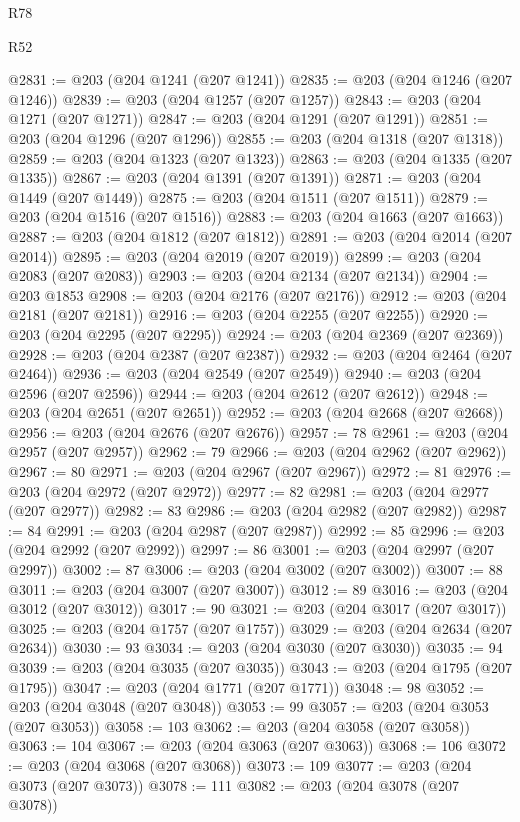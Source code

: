 \begin{lexlean}{R78}
\begin{lexlean}{R52}
\begin{coremodule}
{{{{{{{{{{{{{{{{{{{{{{{{{{{{{{{{{{{{{{{{{{{{{{{{{{{{{{{{{{{{{{{{{{{{{{{{{{{{{{{{{{{{{{{{{{{{{{{{{{{{{{{{{{{{{{{{{{{{{{{{{{{{{{{{{{{{{{{{{{{{{{{{{{{{{{{{{{{{{{{{{{{{{{{{{{{{{{{{{{{{{{{{{{{{{{{{{{{{{{@2831 := @203 (@204 @1241 (@207 @1241))
@2835 := @203 (@204 @1246 (@207 @1246))
@2839 := @203 (@204 @1257 (@207 @1257))
@2843 := @203 (@204 @1271 (@207 @1271))
@2847 := @203 (@204 @1291 (@207 @1291))
@2851 := @203 (@204 @1296 (@207 @1296))
@2855 := @203 (@204 @1318 (@207 @1318))
@2859 := @203 (@204 @1323 (@207 @1323))
@2863 := @203 (@204 @1335 (@207 @1335))
@2867 := @203 (@204 @1391 (@207 @1391))
@2871 := @203 (@204 @1449 (@207 @1449))
@2875 := @203 (@204 @1511 (@207 @1511))
@2879 := @203 (@204 @1516 (@207 @1516))
@2883 := @203 (@204 @1663 (@207 @1663))
@2887 := @203 (@204 @1812 (@207 @1812))
@2891 := @203 (@204 @2014 (@207 @2014))
@2895 := @203 (@204 @2019 (@207 @2019))
@2899 := @203 (@204 @2083 (@207 @2083))
@2903 := @203 (@204 @2134 (@207 @2134))
@2904 := @203 @1853
@2908 := @203 (@204 @2176 (@207 @2176))
@2912 := @203 (@204 @2181 (@207 @2181))
@2916 := @203 (@204 @2255 (@207 @2255))
@2920 := @203 (@204 @2295 (@207 @2295))
@2924 := @203 (@204 @2369 (@207 @2369))
@2928 := @203 (@204 @2387 (@207 @2387))
@2932 := @203 (@204 @2464 (@207 @2464))
@2936 := @203 (@204 @2549 (@207 @2549))
@2940 := @203 (@204 @2596 (@207 @2596))
@2944 := @203 (@204 @2612 (@207 @2612))
@2948 := @203 (@204 @2651 (@207 @2651))
@2952 := @203 (@204 @2668 (@207 @2668))
@2956 := @203 (@204 @2676 (@207 @2676))
@2957 := 78
@2961 := @203 (@204 @2957 (@207 @2957))
@2962 := 79
@2966 := @203 (@204 @2962 (@207 @2962))
@2967 := 80
@2971 := @203 (@204 @2967 (@207 @2967))
@2972 := 81
@2976 := @203 (@204 @2972 (@207 @2972))
@2977 := 82
@2981 := @203 (@204 @2977 (@207 @2977))
@2982 := 83
@2986 := @203 (@204 @2982 (@207 @2982))
@2987 := 84
@2991 := @203 (@204 @2987 (@207 @2987))
@2992 := 85
@2996 := @203 (@204 @2992 (@207 @2992))
@2997 := 86
@3001 := @203 (@204 @2997 (@207 @2997))
@3002 := 87
@3006 := @203 (@204 @3002 (@207 @3002))
@3007 := 88
@3011 := @203 (@204 @3007 (@207 @3007))
@3012 := 89
@3016 := @203 (@204 @3012 (@207 @3012))
@3017 := 90
@3021 := @203 (@204 @3017 (@207 @3017))
@3025 := @203 (@204 @1757 (@207 @1757))
@3029 := @203 (@204 @2634 (@207 @2634))
@3030 := 93
@3034 := @203 (@204 @3030 (@207 @3030))
@3035 := 94
@3039 := @203 (@204 @3035 (@207 @3035))
@3043 := @203 (@204 @1795 (@207 @1795))
@3047 := @203 (@204 @1771 (@207 @1771))
@3048 := 98
@3052 := @203 (@204 @3048 (@207 @3048))
@3053 := 99
@3057 := @203 (@204 @3053 (@207 @3053))
@3058 := 103
@3062 := @203 (@204 @3058 (@207 @3058))
@3063 := 104
@3067 := @203 (@204 @3063 (@207 @3063))
@3068 := 106
@3072 := @203 (@204 @3068 (@207 @3068))
@3073 := 109
@3077 := @203 (@204 @3073 (@207 @3073))
@3078 := 111
@3082 := @203 (@204 @3078 (@207 @3078))
}}}}}}}}}}}}}}}}}}}}}}}}}}}}}}}}}}}}}}}}}}}}}}}}}}}}}}}}}}}}}}}}}}}}}}}}}}}}}}}}}}}}}}}}}}}}}}}}}}}}}}}}}}}}}}}}}}}}}}}}}}}}}}}}}}}}}}}}}}}}}}}}}}}}}}}}}}}}}}}}}}}}}}}}}}}}}}}}}}}}}}}}}}}}}}}}}}}}}}
\end{coremodule}
\end{lexlean}
\end{lexlean}
